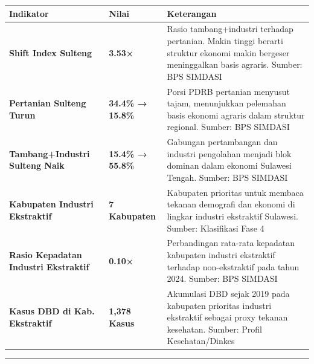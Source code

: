 \documentclass[
]{article}
\newcounter{none} %
\begin{document}
{\def\LTcaptype{none} %
\begin{longtable}[]{@{}
  >{\raggedright\arraybackslash}p{}
  >{\raggedright\arraybackslash}p{}
  >{\raggedright\arraybackslash}p{}@{}}
\toprule\noalign{}
\begin{minipage}[b]{\linewidth}\raggedright
Indikator
\end{minipage} & \begin{minipage}[b]{\linewidth}\raggedright
Nilai
\end{minipage} & \begin{minipage}[b]{\linewidth}\raggedright
Keterangan
\end{minipage} \\
\midrule\noalign{}
\endhead
\bottomrule\noalign{}
\endlastfoot
\textbf{Shift Index Sulteng} & \textbf{3.53×} & Rasio tambang+industri
terhadap pertanian. Makin tinggi berarti struktur ekonomi makin bergeser
meninggalkan basis agraris. Sumber: BPS SIMDASI \\
\textbf{Pertanian Sulteng Turun} & \textbf{34.4\% → 15.8\%} & Porsi PDRB
pertanian menyusut tajam, menunjukkan pelemahan basis ekonomi agraris
dalam struktur regional. Sumber: BPS SIMDASI \\
\textbf{Tambang+Industri Sulteng Naik} & \textbf{15.4\% → 55.8\%} &
Gabungan pertambangan dan industri pengolahan menjadi blok dominan dalam
ekonomi Sulawesi Tengah. Sumber: BPS SIMDASI \\
\textbf{Kabupaten Industri Ekstraktif} & \textbf{7 Kabupaten} &
Kabupaten prioritas untuk membaca tekanan demografi dan ekonomi di
lingkar industri ekstraktif Sulawesi. Sumber: Klasifikasi Fase 4 \\
\textbf{Rasio Kepadatan Industri Ekstraktif} & \textbf{0.10×} &
Perbandingan rata-rata kepadatan kabupaten industri ekstraktif terhadap
non-ekstraktif pada tahun 2024. Sumber: BPS SIMDASI \\
\textbf{Kasus DBD di Kab. Ekstraktif} & \textbf{1,378 Kasus} & Akumulasi
DBD sejak 2019 pada kabupaten prioritas industri ekstraktif sebagai
proxy tekanan kesehatan. Sumber: Profil Kesehatan/Dinkes \\
\end{longtable}
}

\begin{center}\rule{0.5\linewidth}{0.5pt}\end{center}
\end{document}

